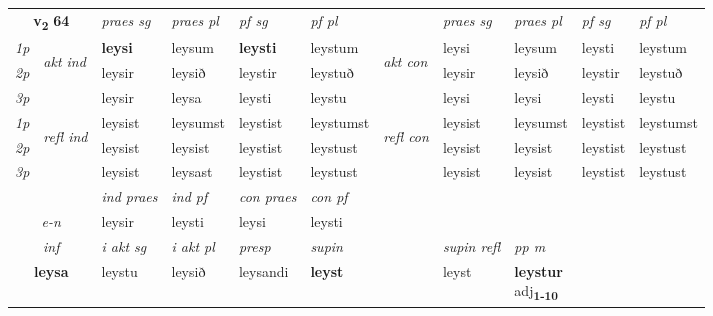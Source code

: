 \noindent
\begin{tabular}{lllllllllll} \toprule
\multicolumn{2}{c}{\textbf{v{\textsubscript{2}}} \Large{\textbf{64}}}  &  \textit{praes sg}  & \textit{praes pl}  &\textit{ pf sg} & \textit{pf pl} &  &  \textit{praes sg}  & \textit{praes pl}  & \textit{pf sg} & \textit{pf pl } \\*
	\cmidrule{3-6} \cmidrule{8-11}
 {\textit{1p}} & \multirow{3}{*}{\begin{turn}{90}\textit{akt ind}\end{turn}} & \textbf{leysi} & leysum & \textbf{leysti} & leystum & \multirow{3}{*}{\begin{turn}{90}\textit{akt con}\end{turn}} &leysi & leysum & leysti & leystum\\*
 {\textit{2p}} &  &  leysir  & leysið & leystir & leystuð & & leysir & leysið & leystir & leystuð \\*
{\textit{3p}} &  & leysir & leysa & leysti & leystu & & leysi & leysi& leysti & leystu \\*
\cmidrule{3-6} \cmidrule{8-11}
 {\textit{1p}} & \multirow{3}{*}{\begin{turn}{90}\textit{refl ind}\end{turn}}  & leysist & leysumst & leystist & leystumst & \multirow{3}{*}{\begin{turn}{90}\textit{refl con}\end{turn}}  &leysist & leysumst & leystist & leystumst \\*
 {\textit{2p}} &  & leysist & leysist & leystist & leystust & &leysist & leysist & leystist & leystust \\*
 {\textit{3p}}  & & leysist & leysast & leystist & leystust & & leysist & leysist& leystist & leystust \\*
\cmidrule{3-6} \cmidrule{8-11}

   & &  \textit{ind praes} & \textit{ind pf} & \textit{con praes} & \textit{con pf} \\*
\multicolumn{2}{c}{ \textit{e-n} } & leysir & leysti & leysi & leysti \\*

\cmidrule{3-9}
   \multicolumn{2}{c}{\textit{inf}}  & \textit{i akt sg} & \textit{i akt pl}   & \textit{presp} & \textit{supin} && \textit{supin refl} & \textit{pp m} \\*
  \multicolumn{2}{c}{\textbf{leysa}} & leystu  & leysið   & leysandi &  \textbf{leyst} && leyst & \specialcell{\textbf{leystur} \\ adj\textbf{\textsubscript{1-10}}} \\*
\end{tabular}

